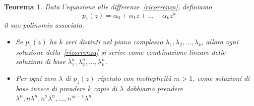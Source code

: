 \documentclass[a4paper]{report}
\newtheorem{theorem}{Teorema}[chapter]
\theoremstyle{definiton}
\theoremstyle{remark}
\begin{document}
\begin{theorem}
Data l'equazione alle differenze~\eqref{ricorrenza}, definiamo
\[
p_1(z) = \alpha_0 + \alpha_1 z + \dots + \alpha_k z^k
\]
il suo polinomio associato. 
\begin{itemize}
    \item Se $p_1(z)$ ha $k$ zeri distinti nel piano complesso $\lambda_1, \lambda_2,\dots, \lambda_k$, allora ogni soluzione della~\eqref{ricorrenza} si scrive come combinazione lineare delle soluzioni di base $\lambda_1^n, \lambda_2^n, \dots, \lambda_k^n$.
    \item Per ogni zero $\lambda$ di $p_1(z)$ ripetuto con molteplicità $m>1$, come soluzioni di base invece di prendere $k$ copie di $\lambda$ dobbiamo prendere $\lambda^n, n\lambda^n, n^2\lambda^n,\dots, n^{m-1}\lambda^n$.
\end{itemize}
\end{theorem}
\end{document}
